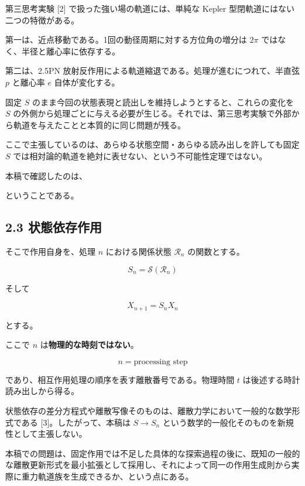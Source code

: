 \documentclass[
  a4paper,
]{ltjsarticle}
\begin{document}
第三思考実験 {[}2{]} で扱った強い場の軌道には、単純な Kepler
型閉軌道にはない二つの特徴がある。

第一は、近点移動である。1回の動径周期に対する方位角の増分は \(2\pi\)
ではなく、半径と離心率に依存する。

第二は、2.5PN 放射反作用による軌道縮退である。処理が進むにつれて、半直弦
\(p\) と離心率 \(e\) 自体が変化する。

固定 \(S\)
のまま今回の状態表現と読出しを維持しようとすると、これらの変化を \(S\)
の外側から処理ごとに与える必要が生じる。それでは、第三思考実験で外部から軌道を与えたことと本質的に同じ問題が残る。

ここで主張しているのは、あらゆる状態空間・あらゆる読み出しを許しても固定
\(S\) では相対論的軌道を絶対に表せない、という不可能性定理ではない。

本稿で確認したのは、

\begin{center}
\end{center}

ということである。

\subsection{2.3
状態依存作用}\label{ux72b6ux614bux4f9dux5b58ux4f5cux7528}

そこで作用自身を、処理 \(n\) における関係状態 \(\mathcal R_n\)
の関数とする。

\[
\boxed{
S_n=\mathcal S(\mathcal R_n)
}
\]

そして

\[
\boxed{
X_{n+1}=S_nX_n
}
\]

とする。

ここで \(n\) は\textbf{物理的な時刻ではない}。

\[
\boxed{n=\text{processing step}}
\]

であり、相互作用処理の順序を表す離散番号である。物理時間 \(t\)
は後述する時計読み出しから得る。

状態依存の差分方程式や離散写像そのものは、離散力学において一般的な数学形式である
{[}3{]}。したがって、本稿は \(S\rightarrow S_n\)
という数学的一般化そのものを新規性として主張しない。

本稿での問題は、固定作用では不足した具体的な探索過程の後に、既知の一般的な離散更新形式を最小拡張として採用し、それによって同一の作用生成則から実際に重力軌道族を生成できるか、という点にある。
\end{document}
